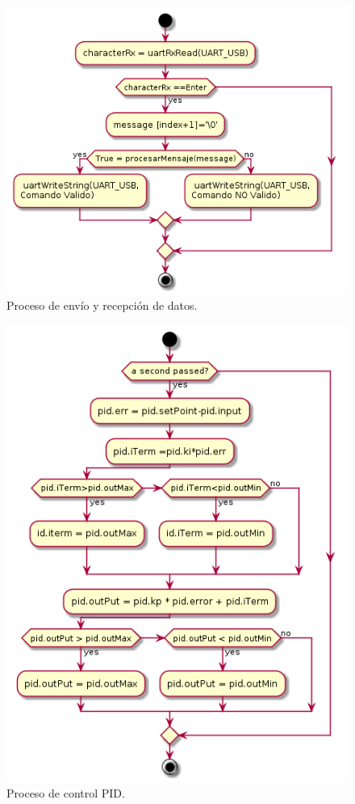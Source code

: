 	\begin{figure}[htpb]
	\centering
	\includegraphics[scale=.65]{./Figures/Porcesorecepcionyenviodedatos.png}
	\caption{Proceso de envío y recepción de datos.}
	\label{fig:Proceso De envió y recepción de datos}
	\end{figure}

	
\begin{figure}[htpb]
	\centering
	\includegraphics[scale=.60]{./Figures/procesocontrolPID.png}
	\caption{Proceso de control PID.}
	\label{fig:Proceso de Control PID}
	\end{figure}
	
